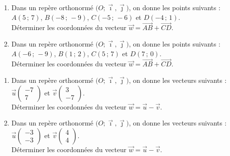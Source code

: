 \documentclass[11pt]{article}
\begin{document}
\begin{exercice}[1]
\begin{enumerate}[itemsep=1em]
\item Dans un repère orthonormé $\big(O ; \vec \imath,\vec \jmath\big)$, on donne les points suivants : $A\left(5\,;\,7\right)$, $B\left(-8\,;\,-9\right)$, $C\left(-5\,;\,-6\right)$ et $D\left(-4\,;\,1\right)$.\\Déterminer les coordonnées du vecteur $\overrightarrow{w}=\overrightarrow{AB}+\overrightarrow{CD}$.
\item Dans un repère orthonormé $\big(O ; \vec \imath,\vec \jmath\big)$, on donne les points suivants : $A\left(-6\,;\,-9\right)$, $B\left(1\,;\,2\right)$, $C\left(5\,;\,7\right)$ et $D\left(7\,;\,0\right)$.\\Déterminer les coordonnées du vecteur $\overrightarrow{w}=\overrightarrow{AB}+\overrightarrow{CD}$.
\end{enumerate}
\end{exercice}

\begin{exercice}[1]

\begin{enumerate}[itemsep=1em]
\item Dans un repère orthonormé $\big(O ; \vec \imath,\vec \jmath\big)$, on donne les vecteurs suivants : $\vec{u}\begin{pmatrix}-7\\7\end{pmatrix}$ et $\vec{v}\begin{pmatrix}3\\-7\end{pmatrix}$.\\Déterminer les coordonnées du vecteur $\overrightarrow{w}=\overrightarrow{u}-\overrightarrow{v}$.
\item Dans un repère orthonormé $\big(O ; \vec \imath,\vec \jmath\big)$, on donne les vecteurs suivants : $\vec{u}\begin{pmatrix}-3\\-3\end{pmatrix}$ et $\vec{v}\begin{pmatrix}4\\4\end{pmatrix}$.\\Déterminer les coordonnées du vecteur $\overrightarrow{w}=\overrightarrow{u}-\overrightarrow{v}$.
\end{enumerate}
\end{exercice}
\end{document}
